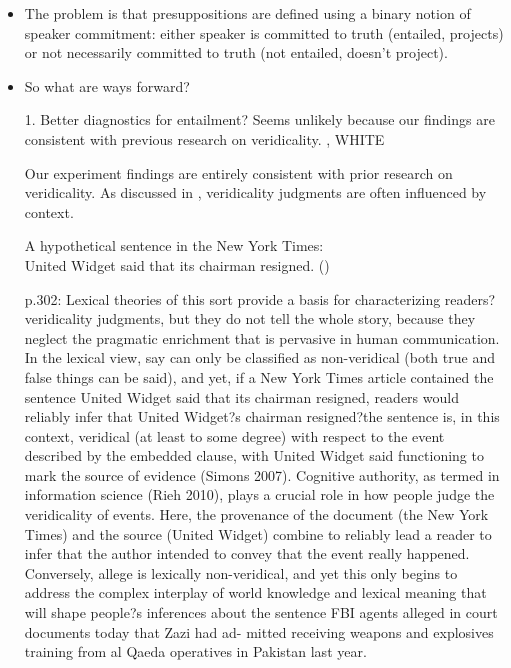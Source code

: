 \documentclass[11pt,fleqn]{article}
\newcommand{\6}{\mbox{$[\hspace*{-.6mm}[$}}
\newcommand{\9}{\mbox{$]\hspace*{-.6mm}]$}}
\begin{document}
{\begin{itemize}
\item The problem is that presuppositions are defined using a binary notion of speaker commitment: either speaker is committed to truth (entailed, projects) or not necessarily committed to truth (not entailed, doesn't project).

\item So what are ways forward? 

1. Better diagnostics for entailment? Seems unlikely because our findings are consistent with previous research on veridicality. \citealt{demarneffe-etal2012}, WHITE

Our experiment findings are entirely consistent with prior research on veridicality. As discussed in \citealt{demarneffe-etal2012}, veridicality judgments are often influenced by context. 

\begin{exe}
\ex A hypothetical sentence in the New York Times: \\ United Widget said that its chairman resigned. \hfill (\citealt[302]{demarneffe-etal2012})
\end{exe}

p.302: Lexical theories of this sort provide a basis for characterizing readers? veridicality judgments, but they do not tell the whole story, because they neglect the pragmatic enrichment that is pervasive in human communication. In the lexical view, say can only be classified as non-veridical (both true and false things can be said), and yet, if a New York Times article contained the sentence United Widget said that its chairman resigned, readers would reliably infer that United Widget?s chairman resigned?the sentence is, in this context, veridical (at least to some degree) with respect to the event described by the embedded clause, with United Widget said functioning to mark the source of evidence (Simons 2007). Cognitive authority, as termed in information science (Rieh 2010), plays a crucial role in how people judge the veridicality of events. Here, the provenance of the document (the New York Times) and the source (United Widget) combine to reliably lead a reader to infer that the author intended to convey that the event really happened. Conversely, allege is lexically non-veridical, and yet this only begins to address the complex interplay of world knowledge and lexical meaning that will shape people?s inferences about the sentence FBI agents alleged in court documents today that Zazi had ad- mitted receiving weapons and explosives training from al Qaeda operatives in Pakistan last year.


\end{itemize}}
\end{document}
